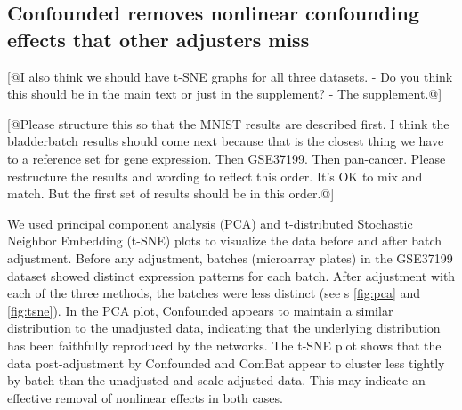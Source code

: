 \documentclass[11pt]{article}
\begin{document}
\subsection{Confounded removes nonlinear confounding effects that other adjusters miss}

[@I also think we should have t-SNE graphs for all three datasets. - Do you think this should be in the main text or just in the supplement? - The supplement.@]

[@Please structure this so that the MNIST results are described first. I think the bladderbatch results should come next because that is the closest thing we have to a reference set for gene expression. Then GSE37199. Then pan-cancer. Please restructure the results and wording to reflect this order. It's OK to mix and match. But the first set of results should be in this order.@]

We used principal component analysis (PCA) and t-distributed Stochastic Neighbor Embedding (t-SNE) \citep{maaten_visualizing_2008} plots to visualize the data before and after batch adjustment.
Before any adjustment, batches (microarray plates) in the GSE37199 dataset showed distinct expression patterns for each batch.
After adjustment with each of the three methods, the batches were less distinct (see \figurename{s} \ref{fig:pca} and \ref{fig:tsne}).
In the PCA plot, Confounded appears to maintain a similar distribution to the unadjusted data, indicating that the underlying distribution has been faithfully reproduced by the networks.
The t-SNE plot shows that the data post-adjustment by Confounded and ComBat appear to cluster less tightly by batch than the unadjusted and scale-adjusted data.
This may indicate an effective removal of nonlinear effects in both cases.
\end{document}
